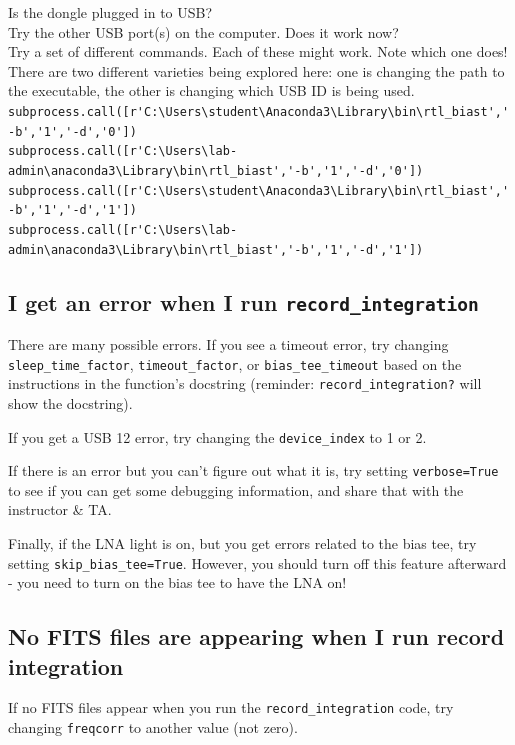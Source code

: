 \documentclass[11pt]{article}
\begin{document}
Is the dongle plugged in to USB?\\
Try the other USB port(s) on the computer.  Does it work now?\\

Try a set of different commands.  Each of these might work.  Note which one
does!  There are two different varieties being explored here: one is changing
the path to the executable, the other is changing which USB ID is being used. \\
\verb|subprocess.call([r'C:\Users\student\Anaconda3\Library\bin\rtl_biast','-b','1','-d','0'])| \\
\verb|subprocess.call([r'C:\Users\lab-admin\anaconda3\Library\bin\rtl_biast','-b','1','-d','0'])| \\
\verb|subprocess.call([r'C:\Users\student\Anaconda3\Library\bin\rtl_biast','-b','1','-d','1'])| \\
\verb|subprocess.call([r'C:\Users\lab-admin\anaconda3\Library\bin\rtl_biast','-b','1','-d','1'])| \\

\subsection{I get an error when I run \texttt{record\_integration}}
There are many possible errors.  If you see a timeout error,
try changing \verb|sleep_time_factor|, \verb|timeout_factor|,
or \verb|bias_tee_timeout| based on the instructions in the
function's docstring (reminder: \verb|record_integration?| will
show the docstring).

If you get a USB 12 error, try changing the \verb|device_index|
to 1 or 2.

If there is an error but you can't figure out what it is,
try setting \verb|verbose=True| to see if you can get some
debugging information, and share that with the instructor \& TA.

Finally, if the LNA light is on, but you get errors related
to the bias tee, try setting \verb|skip_bias_tee=True|.  However,
you should turn off this feature afterward - you need to turn
on the bias tee to have the LNA on!


\subsection{No FITS files are appearing when I run record integration}

If no FITS files appear when you run the \verb|record_integration| code, try
changing \verb|freqcorr| to another value (not zero).
\end{document}

